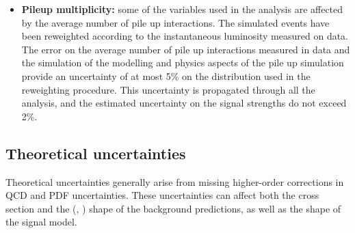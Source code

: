 \begin{itemize}
\item {\bf Pileup multiplicity:} 
some of the variables used in the analysis are affected by the average number of pile up interactions. The simulated events have been reweighted according to the instantaneous luminosity measured on data. The error on the average number of pile up interactions measured in data and the simulation of the modelling and physics aspects of the pile up simulation provide an uncertainty of at most 5\% on the distribution used in the reweighting procedure. This uncertainty is propagated through all the analysis, and the estimated uncertainty on the signal strengths do not exceed 2\%.

\end{itemize}

\subsection{Theoretical uncertainties \label{subsec:thsyst}}

Theoretical uncertainties generally arise from missing higher-order corrections in QCD and PDF uncertainties. These uncertainties can affect both the cross section and the (\mll, \mt) shape of the background predictions, as well as the shape of the signal model.


